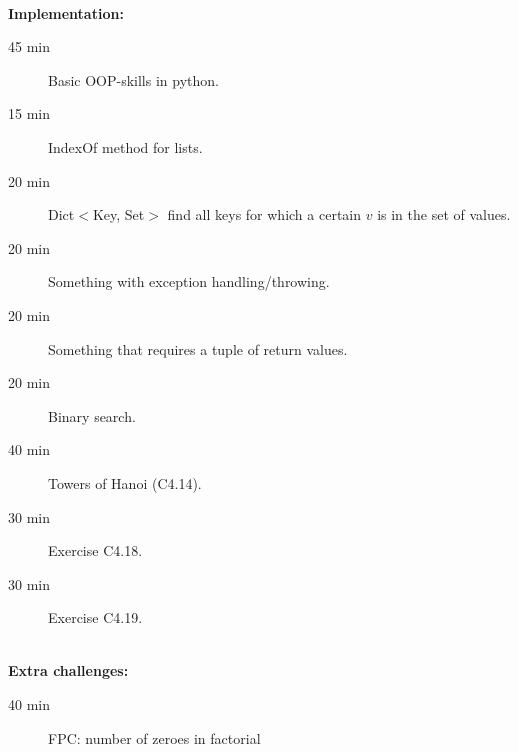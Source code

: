 \hfill\\
\textbf{Implementation:}\\
\begin{description}
	\item[45 min] Basic OOP-skills in python. 
	\item[15 min] IndexOf method for lists.
	\item[20 min] Dict$<$Key, Set$>$ find all keys for which a certain $v$ is in the set of values.
	\item[20 min] Something with exception handling/throwing.
	\item[20 min] Something that requires a tuple of return values.
	\item[20 min] Binary search.
	\item[40 min] Towers of Hanoi (C4.14).
	\item[30 min] Exercise C4.18.
	\item[30 min] Exercise C4.19.
\end{description}

\hfill\\
\textbf{Extra challenges:}\\
\begin{description}
	\item[40 min] FPC: number of zeroes in factorial 
\end{description}
